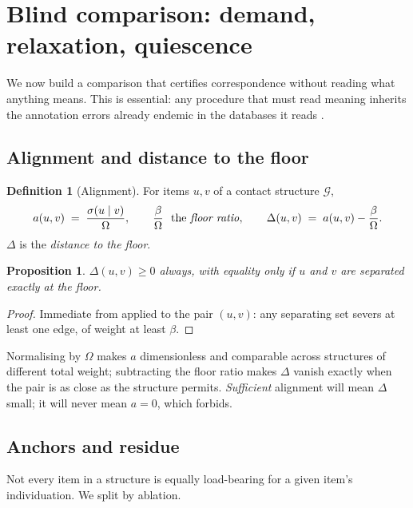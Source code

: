 \documentclass[11pt,twocolumn,a4paper]{article}
\theoremstyle{plain}
\newtheorem{proposition}[theorem]{Proposition}
\theoremstyle{definition}
\newtheorem{definition}[theorem]{Definition}
\theoremstyle{remark}
\newcommand{\flo}{\beta}                       %
\newcommand{\sep}{\sigma}                      %
\newcommand{\Gph}{\mathcal{G}}
\newcommand{\Om}{\Omega}
\begin{document}
\section{Blind comparison: demand, relaxation, quiescence}
\label{sec:blind}

We now build a comparison that certifies correspondence without reading
what anything means. This is essential: any procedure that must read
meaning inherits the annotation errors already endemic in the databases
it reads \cite{schnoes2009annotation}.

\subsection{Alignment and distance to the floor}

\begin{definition}[Alignment]
\label{def:alignment}
For items $u,v$ of a contact structure $\Gph$,
\[
  a(u,v)\;=\;\frac{\sep(u\mid v)}{\Om}, \qquad
  \frac{\flo}{\Om}\ \text{ the \emph{floor ratio}}, \qquad
  \Delta(u,v)\;=\;a(u,v)-\frac{\flo}{\Om}.
\]
$\Delta$ is the \emph{distance to the floor}.
\end{definition}

\begin{proposition}
\label{prop:nonneg}
$\Delta(u,v)\ge0$ always, with equality only if $u$ and $v$ are
separated exactly at the floor.
\end{proposition}

\begin{proof}
Immediate from  applied to the pair $(u,v)$: any
separating set severs at least one edge, of weight at least $\flo$.
\end{proof}

Normalising by $\Om$ makes $a$ dimensionless and comparable across
structures of different total weight; subtracting the floor ratio makes
$\Delta$ vanish exactly when the pair is as close as the structure
permits. \emph{Sufficient} alignment will mean $\Delta$ small; it will
never mean $a=0$, which  forbids.

\subsection{Anchors and residue}

Not every item in a structure is equally load-bearing for a given item's
individuation. We split by ablation.
\end{document}
